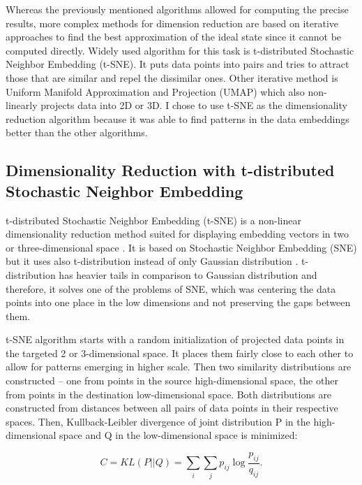 Whereas the previously mentioned algorithms allowed for computing the precise results, more complex methods for dimension reduction are based on iterative approaches to find the best approximation of the ideal state since it cannot be computed directly. Widely used algorithm for this task is t-distributed Stochastic Neighbor Embedding (t-SNE). It puts data points into pairs and tries to attract those that are similar and repel the dissimilar ones. Other iterative method is Uniform Manifold Approximation and Projection (UMAP) which also non-linearly projects data into 2D or 3D. I chose to use t-SNE as the dimensionality reduction algorithm because it was able to find patterns in the data embeddings better than the other algorithms.

\subsection{Dimensionality Reduction with t-distributed Stochastic Neighbor Embedding}

t-distributed Stochastic Neighbor Embedding (t-SNE) is a non-linear dimensionality reduction method suited for displaying embedding vectors in two or three-dimensional space \cite{tsne-vandermaaten08a}. It is based on Stochastic Neighbor Embedding (SNE) but it uses also t-distribution instead of only Gaussian distribution \cite{sne-NIPS2002_6150ccc6}. t-distribution has heavier tails in comparison to Gaussian distribution and therefore, it solves one of the problems of SNE, which was centering the data points into one place in the low dimensions and not preserving the gaps between them.

t-SNE algorithm starts with a random initialization of projected data points in the targeted 2 or 3-dimensional space. It places them fairly close to each other to allow for patterns emerging in higher scale. Then two similarity distributions are constructed -- one from points in the source high-dimensional space, the other from points in the destination low-dimensional space. Both distributions are constructed from distances between all pairs of data points in their respective spaces. Then, Kullback-Leibler divergence of joint distribution P in the high-dimensional space and Q in the low-dimensional space is minimized:

\begin{equation}
    \label{eq:tsne-kl}
    C = KL(P||Q) = \sum \limits_{i} \sum \limits_{j} p_{i j} \log \frac{p_{i j}}{q_{i j}}.
\end{equation}

